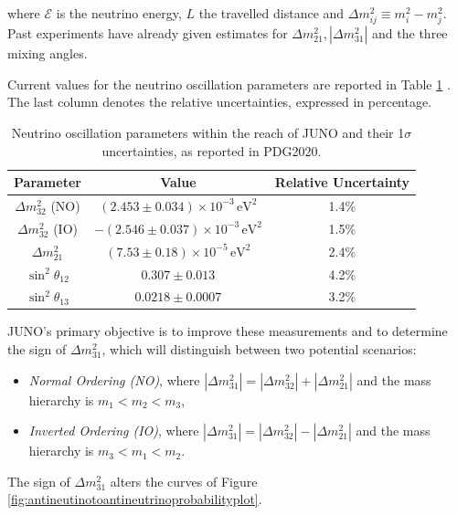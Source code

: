 where $\mathcal{E}$ is the neutrino energy, $L$ the travelled distance and $\Delta m_{i j}^2 \equiv m_i^2-m_j^2$. \\
Past experiments have already given estimates for $\Delta m_{21}^2,\left|\Delta m_{31}^2\right|$ and the three mixing angles.

Current values for the neutrino oscillation parameters are reported in Table \ref{tab:neutrino_params} \cite{pdg}. The last column denotes the relative uncertainties, expressed in percentage.


\begin{table}[h]
\centering
\small
\begin{tabular}{ccc}
\hline
\toprule
\textbf{Parameter} & \textbf{Value} & \textbf{Relative Uncertainty} \\ \midrule
$\Delta m^2_{32}$ (NO) & $(2.453 \pm 0.034) \times 10^{-3} \, \text{eV}^2$ & 1.4\% \\
$\Delta m^2_{32}$ (IO) & $-(2.546 \pm 0.037) \times 10^{-3} \, \text{eV}^2$ & 1.5\% \\
$\Delta m^2_{21}$ & $(7.53 \pm 0.18) \times 10^{-5} \, \text{eV}^2$ & 2.4\% \\
$\sin^2 \theta_{12}$ & $0.307 \pm 0.013$ & 4.2\% \\
$\sin^2 \theta_{13}$ & $0.0218 \pm 0.0007$ & 3.2\% \\ \bottomrule
\hline
\end{tabular}
\caption{Neutrino oscillation parameters within the reach of JUNO and their 1$\sigma$ uncertainties, as reported in PDG2020. \cite{pdg}}
\label{tab:neutrino_params}
\end{table}

JUNO's primary objective is to improve these measurements and to determine the sign of $\Delta m_{31}^2$, which will distinguish between two potential scenarios:
\begin{itemize}
	\item \textit{Normal Ordering (NO)}, where $\left|\Delta m_{31}^2\right|=\left|\Delta m_{32}^2\right|+\left|\Delta m_{21}^2\right|$ and the mass hierarchy is $m_1<m_2<m_3$,
	\item \textit{Inverted Ordering (IO)}, where $\left|\Delta m_{31}^2\right|=\left|\Delta m_{32}^2\right|-\left|\Delta m_{21}^2\right|$ and the mass hierarchy is $m_3<m_1<m_2$.
\end{itemize}
The sign of $\Delta m_{31}^2$ alters the curves of Figure \ref{fig:antineutinotoantineutrinoprobabilityplot}.



